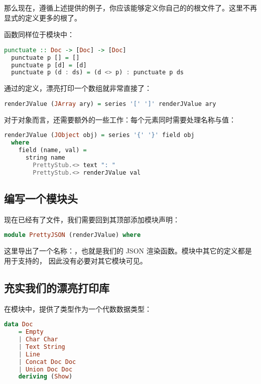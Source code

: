 \documentclass[./main.tex]{subfiles}
\begin{document}
那么现在，遵循上述提供的例子，你应该能够定义你自己的的根文件了。这里不再显式的定义更多的根了。

函数同样位于模块中：

\begin{lstlisting}[language=Haskell]
  punctuate :: Doc -> [Doc] -> [Doc]
  punctuate p [] = []
  punctuate p [d] = [d]
  punctuate p (d : ds) = (d <> p) : punctuate p ds
\end{lstlisting}

通过的定义，漂亮打印一个数组就非常直接了：

\begin{lstlisting}[language=Haskell]
  renderJValue (JArray ary) = series '[' ']' renderJValue ary
\end{lstlisting}

对于对象而言，还需要额外的一些工作：每个元素同时需要处理名称与值：

\begin{lstlisting}[language=Haskell]
  renderJValue (JObject obj) = series '{' '}' field obj
  where
    field (name, val) =
      string name
        PrettyStub.<> text ": "
        PrettyStub.<> renderJValue val
\end{lstlisting}

\subsection*{编写一个模块头}

现在已经有了文件，我们需要回到其顶部添加模块声明：

\begin{lstlisting}[language=Haskell]
  module PrettyJSON (renderJValue) where
\end{lstlisting}

这里导出了一个名称：，也就是我们的 JSON 渲染函数。模块中其它的定义都是用于支持的，
因此没有必要对其它模块可见。

\subsection*{充实我们的漂亮打印库}

在模块中，提供了类型作为一个代数数据类型：

\begin{lstlisting}[language=Haskell]
  data Doc
    = Empty
    | Char Char
    | Text String
    | Line
    | Concat Doc Doc
    | Union Doc Doc
    deriving (Show)
\end{lstlisting}
\end{document}
